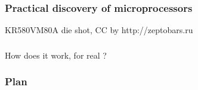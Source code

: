 \documentclass[11pt,a4paper,compress]{beamer}%
\begin{document}
\AtBeginSubsection[] %
{
}
\setcounter{tocdepth}{1}
\begin{frame}
\frametitle{Practical discovery of microprocessors}
\begin{center}
\end{center}
KR580VM80A die shot, CC by http://zeptobars.ru
\end{frame}
\begin{frame}
\frametitle{}
\begin{center}
{\Huge How does it work, for real ?}
\end{center}

\end{frame}

\begin{frame}
	\frametitle{Plan}
	\tableofcontents[hidesubsections]
\end{frame}
\setcounter{tocdepth}{3}
\end{document}
